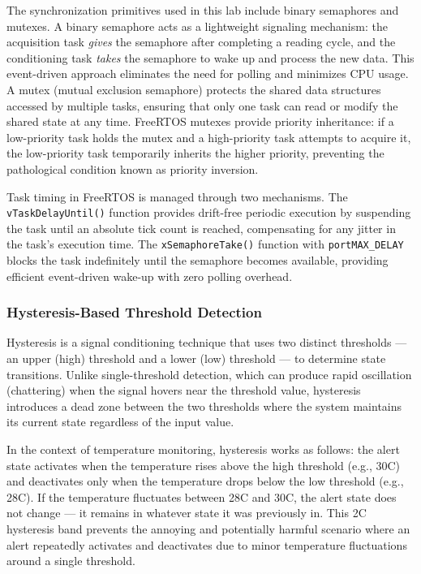 The synchronization primitives used in this lab include binary semaphores and mutexes. A binary semaphore acts as a lightweight signaling mechanism: the acquisition task \textit{gives} the semaphore after completing a reading cycle, and the conditioning task \textit{takes} the semaphore to wake up and process the new data. This event-driven approach eliminates the need for polling and minimizes CPU usage. A mutex (mutual exclusion semaphore) protects the shared data structures accessed by multiple tasks, ensuring that only one task can read or modify the shared state at any time. FreeRTOS mutexes provide priority inheritance: if a low-priority task holds the mutex and a high-priority task attempts to acquire it, the low-priority task temporarily inherits the higher priority, preventing the pathological condition known as priority inversion.

Task timing in FreeRTOS is managed through two mechanisms. The \texttt{vTaskDelayUntil()} function provides drift-free periodic execution by suspending the task until an absolute tick count is reached, compensating for any jitter in the task's execution time. The \texttt{xSemaphoreTake()} function with \texttt{portMAX\_DELAY} blocks the task indefinitely until the semaphore becomes available, providing efficient event-driven wake-up with zero polling overhead.

\subsubsection{Hysteresis-Based Threshold Detection}

Hysteresis is a signal conditioning technique that uses two distinct thresholds --- an upper (high) threshold and a lower (low) threshold --- to determine state transitions. Unlike single-threshold detection, which can produce rapid oscillation (chattering) when the signal hovers near the threshold value, hysteresis introduces a dead zone between the two thresholds where the system maintains its current state regardless of the input value.

In the context of temperature monitoring, hysteresis works as follows: the alert state activates when the temperature rises above the high threshold (e.g., 30\textdegree C) and deactivates only when the temperature drops below the low threshold (e.g., 28\textdegree C). If the temperature fluctuates between 28\textdegree C and 30\textdegree C, the alert state does not change --- it remains in whatever state it was previously in. This 2\textdegree C hysteresis band prevents the annoying and potentially harmful scenario where an alert repeatedly activates and deactivates due to minor temperature fluctuations around a single threshold.

